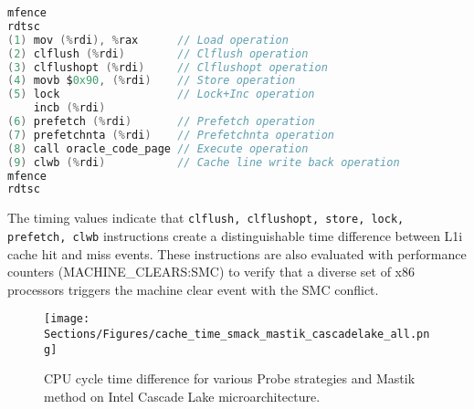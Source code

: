 \lstset{style=mystyle}
\begin{lstlisting}[caption={Measuring the execution time of nine different x86 instructions. These instructions represent load, flush, store, lock, prefetch, execute, and cache line write-back operations.},language=C,label=lst:SMC_inst,basicstyle=\ttfamily\scriptsize, basewidth={.48em}, backgroundcolor=\color{white},morekeywords={.data,.global,.quad,.space,.macro,.endm,mfence,rdtsc,shl,add,sub,pop,push,ret,lea,.text,.align,.rept,.endr}]
mfence
rdtsc
(1) mov (%rdi), %rax      // Load operation
(2) clflush (%rdi)        // Clflush operation
(3) clflushopt (%rdi)     // Clflushopt operation
(4) movb $0x90, (%rdi)    // Store operation
(5) lock                  // Lock+Inc operation  
    incb (%rdi)
(6) prefetch (%rdi)       // Prefetch operation
(7) prefetchnta (%rdi)    // Prefetchnta operation
(8) call oracle_code_page // Execute operation
(9) clwb (%rdi)           // Cache line write back operation
mfence
rdtsc
\end{lstlisting}

The timing values indicate that \texttt{clflush, clflushopt, store, lock, prefetch, clwb} instructions create a distinguishable time difference between L1i cache hit and miss events. 
These instructions are also evaluated with performance counters (MACHINE\_CLEARS:SMC) to verify that a diverse set of x86 processors triggers the machine clear event with the SMC conflict.



\begin{figure}[t]
    \centering
    {
    
    \texttt{[image: Sections/Figures/cache\_time\_smack\_mastik\_cascadelake\_all.png]}
    }
    \caption{CPU cycle time difference for various Probe strategies and Mastik~\cite{yarom2016mastik} method on Intel Cascade Lake microarchitecture.}
    \label{fig:CPUcycleTime_cascade}
\end{figure}

